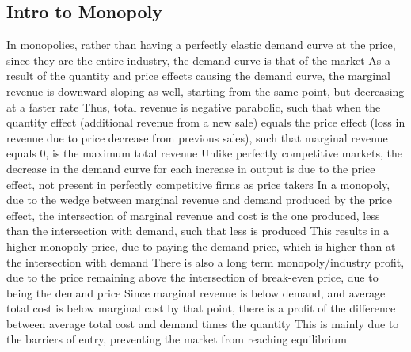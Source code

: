\documentclass[11 pt, twoside]{article}
\newenvironment{outline*}
{
	\begin{outline}[enumerate]
	}
	{\end{outline}
}
\begin{document}
\subsection{Intro to Monopoly}
\begin{outline*}
\1 In monopolies, rather than having a perfectly elastic demand curve at the price, since they are the entire industry, the demand curve is that of the market
\2 As a result of the quantity and price effects causing the demand curve, the marginal revenue is downward sloping as well, starting from the same point, but decreasing at a faster rate
\2 Thus, total revenue is negative parabolic, such that when the quantity effect (additional revenue from a new sale) equals the price effect (loss in revenue due to price decrease from previous sales), such that marginal revenue equals 0, is the maximum total revenue
\1 Unlike perfectly competitive markets, the decrease in the demand curve for each increase in output is due to the price effect, not present in perfectly competitive firms as price takers
\1 In a monopoly, due to the wedge between marginal revenue and demand produced by the price effect, the intersection of marginal revenue and cost is the one produced, less than the intersection with demand, such that less is produced
\2 This results in a higher monopoly price, due to paying the demand price, which is higher than at the intersection with demand
\2 There is also a long term monopoly/industry profit, due to the price remaining above the intersection of break-even price, due to being the demand price
\3 Since marginal revenue is below demand, and average total cost is below marginal cost by that point, there is a profit of the difference between average total cost and demand times the quantity
\3 This is mainly due to the barriers of entry, preventing the market from reaching equilibrium
\end{outline*}
\end{document}
